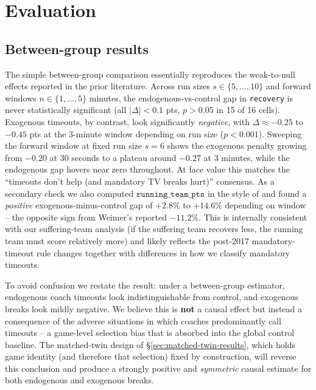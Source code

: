 \documentclass[twoside,11pt]{article}
\begin{document}
\section{Evaluation}

\subsection{Between-group results}

The simple between-group comparison essentially reproduces the weak-to-null effects reported in the prior
literature. Across run sizes $s \in \{5,\dots,10\}$ and forward windows $n \in \{1,\dots,5\}$ minutes, the
endogenous-vs-control gap in \texttt{recovery} is never statistically significant (all $|\Delta| < 0.1$ pts,
$p > 0.05$ in 15 of 16 cells). Exogenous timeouts, by contrast, look significantly \emph{negative}, with
$\Delta \approx -0.25$ to $-0.45$ pts at the 3-minute window depending on run size ($p < 0.001$). Sweeping
the forward window at fixed run size $s = 6$ shows the exogenous penalty growing from $-0.20$ at 30 seconds
to a plateau around $-0.27$ at 3 minutes, while the endogenous gap hovers near zero throughout. At face value
this matches the ``timeouts don't help (and mandatory TV breaks hurt)'' consensus. As a secondary check we
also computed $\texttt{running\_team\_pts}$ in the style of \citet{weimer2023causal} and found a
\emph{positive} exogenous-minus-control gap of $+2.8\%$ to $+14.6\%$ depending on window  --  the opposite sign
from Weimer's reported $-11.2\%$. This is internally consistent with our suffering-team analysis (if the
suffering team recovers less, the running team must score relatively more) and likely reflects the post-2017
mandatory-timeout rule changes together with differences in how we classify mandatory timeouts.

To avoid confusion we restate the result: under a between-group estimator, endogenous coach timeouts look
indistinguishable from control, and exogenous breaks look mildly negative. We believe this is \textbf{not} a
causal effect but instead a consequence of the adverse situations in which coaches predominantly call
timeouts -- a game-level selection bias that is absorbed into the global control baseline. The matched-twin
design of \S\ref{sec:matched-twin-results}, which holds game identity (and therefore that selection) fixed
by construction, will reverse this conclusion and produce a strongly positive and \emph{symmetric} causal
estimate for both endogenous and exogenous breaks.
\end{document}

